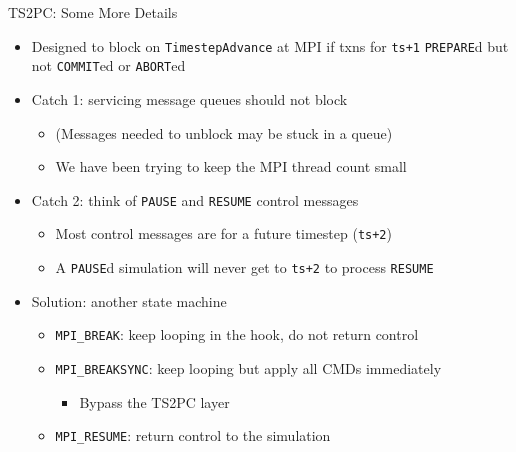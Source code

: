 \documentclass[
  ignorenonframetext,
]{beamer}
\providecommand{\tightlist}{%
  \setlength{\itemsep}{0pt}\setlength{\parskip}{0pt}}\usepackage{longtable,booktabs,array}
\begin{document}
\begin{frame}[fragile]{TS2PC: Some More Details}
\label{ts2pc-some-more-details}
\begin{itemize}
\tightlist
\item
  Designed to block on \texttt{TimestepAdvance} at MPI if txns for
  \texttt{ts+1} \texttt{PREPARE}d but not \texttt{COMMIT}ed or
  \texttt{ABORT}ed
\end{itemize}

\pause

\begin{itemize}
\tightlist
\item
  Catch 1: servicing message queues should not block

  \begin{itemize}
  \tightlist
  \item
    (Messages needed to unblock may be stuck in a queue)
  \item
    We have been trying to keep the MPI thread count small
  \end{itemize}
\end{itemize}

\pause

\begin{itemize}
\tightlist
\item
  Catch 2: think of \texttt{PAUSE} and \texttt{RESUME} control messages

  \begin{itemize}
  \tightlist
  \item
    Most control messages are for a future timestep (\texttt{ts+2})
  \item
    A \texttt{PAUSE}d simulation will never get to \texttt{ts+2} to
    process \texttt{RESUME}
  \end{itemize}
\end{itemize}

\pause

\begin{itemize}
\tightlist
\item
  Solution: another state machine

  \begin{itemize}
  \tightlist
  \item
    \texttt{MPI\_BREAK}: keep looping in the hook, do not return control
  \item
    \texttt{MPI\_BREAKSYNC}: keep looping but apply all CMDs immediately

    \begin{itemize}
    \tightlist
    \item
      Bypass the TS2PC layer
    \end{itemize}
  \item
    \texttt{MPI\_RESUME}: return control to the simulation
  \end{itemize}
\end{itemize}
\end{frame}
\end{document}
